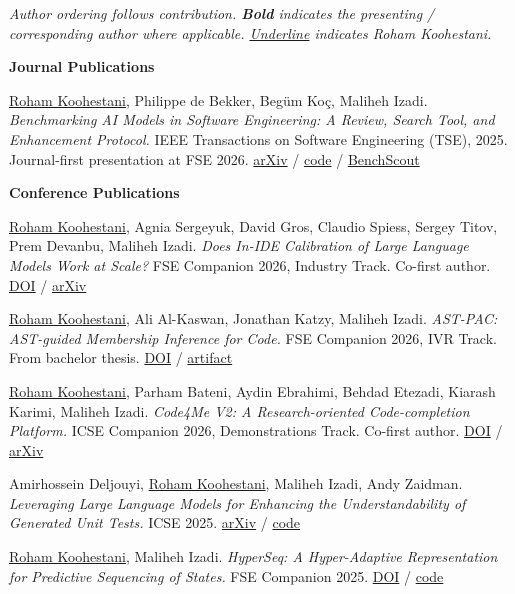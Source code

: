 \documentclass[11pt,letterpaper]{article}
\newenvironment{publist}[1][0]{%
  \begin{list}{}{%
    \setlength{\leftmargin}{2.4em}%
    \setlength{\itemsep}{6pt}%
    \setlength{\parsep}{0pt}%
    \setlength{\topsep}{4pt}%
  }%
}{\end{list}}
\begin{document}
\textit{Author ordering follows contribution. \textbf{Bold} indicates the presenting / corresponding author
where applicable. \underline{Underline} indicates Roham Koohestani.}

\vspace{6pt}
\textbf{Journal Publications}

\begin{publist}
\item[{[J1]}]
  \underline{Roham Koohestani}, Philippe de Bekker, Beg\"{u}m Ko\c{c}, Maliheh Izadi.
  \textit{Benchmarking AI Models in Software Engineering: A Review, Search Tool,
  and Enhancement Protocol.}
  IEEE Transactions on Software Engineering (TSE), 2025.
  Journal-first presentation at FSE 2026.
  \href{https://arxiv.org/abs/2503.05860}{arXiv} /
  \href{https://github.com/AISE-TUDelft/AI4SE-benchmarks}{code} /
  \href{https://evalpro.online/}{BenchScout}
\end{publist}

\vspace{6pt}
\textbf{Conference Publications}

\begin{publist}
\item[{[C5]}]
  \underline{Roham Koohestani}, Agnia Sergeyuk, David Gros, Claudio Spiess,
  Sergey Titov, Prem Devanbu, Maliheh Izadi.
  \textit{Does In-IDE Calibration of Large Language Models Work at Scale?}
  FSE Companion 2026, Industry Track. Co-first author.
  \href{https://doi.org/10.1145/3803437.3805234}{DOI} /
  \href{https://arxiv.org/abs/2510.22614}{arXiv}

\item[{[C4]}]
  \underline{Roham Koohestani}, Ali Al-Kaswan, Jonathan Katzy, Maliheh Izadi.
  \textit{AST-PAC: AST-guided Membership Inference for Code.}
  FSE Companion 2026, IVR Track. From bachelor thesis.
  \href{https://doi.org/10.1145/3803437.3805588}{DOI} /
  \href{https://doi.org/10.5281/zenodo.18348152}{artifact}

\item[{[C3]}]
  \underline{Roham Koohestani}, Parham Bateni, Aydin Ebrahimi, Behdad Etezadi,
  Kiarash Karimi, Maliheh Izadi.
  \textit{Code4Me V2: A Research-oriented Code-completion Platform.}
  ICSE Companion 2026, Demonstrations Track. Co-first author.
  \href{https://doi.org/10.1145/3774748.3787616}{DOI} /
  \href{https://arxiv.org/abs/2510.03755}{arXiv}

\item[{[C2]}]
  Amirhossein Deljouyi, \underline{Roham Koohestani}, Maliheh Izadi, Andy Zaidman.
  \textit{Leveraging Large Language Models for Enhancing the Understandability of
  Generated Unit Tests.}
  ICSE 2025.
  \href{https://arxiv.org/abs/2408.11710}{arXiv} /
  \href{https://github.com/amirdeljouyi/UTGen}{code}

\item[{[C1]}]
  \underline{Roham Koohestani}, Maliheh Izadi.
  \textit{HyperSeq: A Hyper-Adaptive Representation for Predictive Sequencing of States.}
  FSE Companion 2025.
  \href{https://doi.org/10.1145/3696630.3728526}{DOI} /
  \href{https://github.com/hyperseq-replication/package}{code}
\end{publist}
\end{document}
